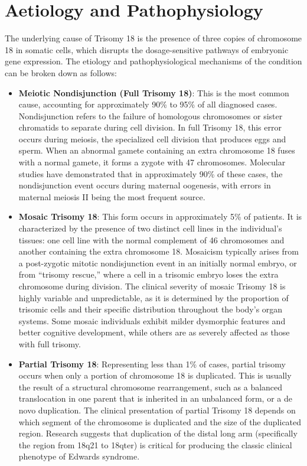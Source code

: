 \section*{Aetiology and Pathophysiology}
The underlying cause of Trisomy 18 is the presence of three copies of chromosome 18 in somatic cells, which disrupts the dosage-sensitive pathways of embryonic gene expression. The etiology and pathophysiological mechanisms of the condition can be broken down as follows:
\begin{itemize}
    \item \textbf{Meiotic Nondisjunction (Full Trisomy 18)}: This is the most common cause, accounting for approximately 90\% to 95\% of all diagnosed cases. Nondisjunction refers to the failure of homologous chromosomes or sister chromatids to separate during cell division. In full Trisomy 18, this error occurs during meiosis, the specialized cell division that produces eggs and sperm. When an abnormal gamete containing an extra chromosome 18 fuses with a normal gamete, it forms a zygote with 47 chromosomes. Molecular studies have demonstrated that in approximately 90\% of these cases, the nondisjunction event occurs during maternal oogenesis, with errors in maternal meiosis II being the most frequent source.
    \item \textbf{Mosaic Trisomy 18}: This form occurs in approximately 5\% of patients. It is characterized by the presence of two distinct cell lines in the individual's tissues: one cell line with the normal complement of 46 chromosomes and another containing the extra chromosome 18. Mosaicism typically arises from a post-zygotic mitotic nondisjunction event in an initially normal embryo, or from ``trisomy rescue,'' where a cell in a trisomic embryo loses the extra chromosome during division. The clinical severity of mosaic Trisomy 18 is highly variable and unpredictable, as it is determined by the proportion of trisomic cells and their specific distribution throughout the body's organ systems. Some mosaic individuals exhibit milder dysmorphic features and better cognitive development, while others are as severely affected as those with full trisomy.
    \item \textbf{Partial Trisomy 18}: Representing less than 1\% of cases, partial trisomy occurs when only a portion of chromosome 18 is duplicated. This is usually the result of a structural chromosome rearrangement, such as a balanced translocation in one parent that is inherited in an unbalanced form, or a de novo duplication. The clinical presentation of partial Trisomy 18 depends on which segment of the chromosome is duplicated and the size of the duplicated region. Research suggests that duplication of the distal long arm (specifically the region from 18q21 to 18qter) is critical for producing the classic clinical phenotype of Edwards syndrome.

\end{itemize}
